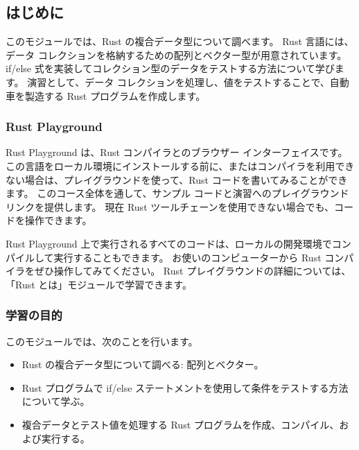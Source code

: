 \subsection{はじめに}

このモジュールでは、Rust の複合データ型について調べます。 Rust 言語には、データ コレクションを格納するための配列とベクター型が用意されています。 if/else 式を実装してコレクション型のデータをテストする方法について学びます。 演習として、データ コレクションを処理し、値をテストすることで、自動車を製造する Rust プログラムを作成します。

\subsubsection{Rust Playground}

Rust Playground は、Rust コンパイラとのブラウザー インターフェイスです。 この言語をローカル環境にインストールする前に、またはコンパイラを利用できない場合は、プレイグラウンドを使って、Rust コードを書いてみることができます。 このコース全体を通して、サンプル コードと演習へのプレイグラウンド リンクを提供します。 現在 Rust ツールチェーンを使用できない場合でも、コードを操作できます。

Rust Playground 上で実行されるすべてのコードは、ローカルの開発環境でコンパイルして実行することもできます。 お使いのコンピューターから Rust コンパイラをぜひ操作してみてください。 Rust プレイグラウンドの詳細については、「Rust とは」モジュールで学習できます。

\subsubsection{学習の目的}

このモジュールでは、次のことを行います。

\begin{itemize}
\item Rust の複合データ型について調べる: 配列とベクター。
\item Rust プログラムで if/else ステートメントを使用して条件をテストする方法について学ぶ。
\item 複合データとテスト値を処理する Rust プログラムを作成、コンパイル、および実行する。
\end{itemize}
